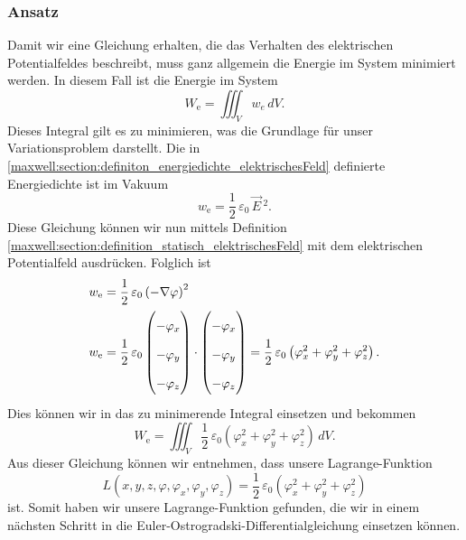 \subsubsection{Ansatz}
Damit wir eine Gleichung erhalten, die das Verhalten des elektrischen Potentialfeldes beschreibt, muss ganz allgemein die Energie im System minimiert werden. 
In diesem Fall ist die Energie im System
\[
W_{\text{e}}
=
\iiint_V w_e\, dV.
\]
Dieses Integral gilt es zu minimieren, was die Grundlage für unser Variationsproblem darstellt.
Die in \eqref{maxwell:section:definiton_energiedichte_elektrischesFeld} definierte Energiedichte ist im Vakuum
\[
w_{\text{e}}
=
\frac{1}{2}\,\varepsilon_0\,\vec{E}\,^2.
\]
Diese Gleichung können wir nun mittels Definition \eqref{maxwell:section:definition_statisch_elektrischesFeld} mit dem elektrischen Potentialfeld ausdrücken.
Folglich ist
\begin{align}
\renewcommand{\arraystretch}{1.9}
w_{\text{e}}
&=
\frac{1}{2}\,\varepsilon_0\left(-\nabla\varphi\right)^2
\\
w_{\text{e}}
&=
\frac{1}{2}\,\varepsilon_0
\begin{pmatrix}
\displaystyle
-\varphi_x\\
\displaystyle
-\varphi_y\\
\displaystyle
-\varphi_z
\end{pmatrix}
\cdot
\begin{pmatrix}
\displaystyle
-\varphi_x\\
\displaystyle
-\varphi_y\\
\displaystyle
-\varphi_z
\end{pmatrix}
=
\frac{1}{2}\,\varepsilon_0\left(\varphi_x^2 + \varphi_y^2 + \varphi_z^2\right).
\label{maxwell:section:energiedichte}
\end{align}
Dies können wir in das zu minimerende Integral einsetzen und bekommen
\begin{equation}
	W_{\text{e}}
	=
	\iiint_V \frac{1}{2}\,\varepsilon_0\left(\varphi_x^2 + \varphi_y^2 + \varphi_z^2\right)\, dV.
	\label{maxwell:section:energieintegral_quellenfrei}
\end{equation}
Aus dieser Gleichung können wir entnehmen, dass unsere Lagrange-Funktion
\begin{equation}
	L(x,y,z,\varphi,\varphi_x,\varphi_y,\varphi_z)
	=
	\frac{1}{2}\,\varepsilon_0\left(\varphi_x^2 + \varphi_y^2 + \varphi_z^2\right)
	\label{maxwell:section:lagrangefunktion_quellenfrei}
\end{equation}
ist.
Somit haben wir unsere Lagrange-Funktion gefunden, die wir in einem nächsten Schritt in die Euler-Ostrogradski-Differentialgleichung einsetzen können.

